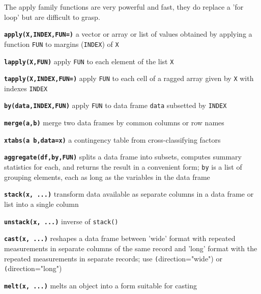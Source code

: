 \documentclass[8pt,landscape]{article}
\newcommand{\code}{\texttt}
\newcommand{\bcode}[1]{\texttt{\textbf{#1}}}
\begin{document}
\begin{multicols*}{3}
The apply family functions are very powerful and fast, they do replace a 'for loop' but are difficult to grasp. 

\bcode{apply(X,INDEX,FUN=)} a vector or array or list of values obtained by applying a
     function \code{FUN} to margins (\code{INDEX}) of \code{X}

\bcode{lapply(X,FUN)} apply \code{FUN} to each element of the list \code{X}

\bcode{tapply(X,INDEX,FUN=)} apply \code{FUN} to each cell
of a ragged array given by \code{X} with indexes \code{INDEX}

\bcode{by(data,INDEX,FUN)} apply \code{FUN} to data frame \code{data}
subsetted by \code{INDEX}

\bcode{merge(a,b)} merge two data frames by common columns or row names

\bcode{xtabs(a~b,data=x)} a contingency table from cross-classifying factors

\bcode{aggregate(df,by,FUN)} splits a data frame into subsets, computes summary statistics for
     each, and returns the result in a convenient form; \code{by} is a
     list of grouping elements, each as long as the variables in the data frame

\bcode{stack(x, ...)} transform data available as
     separate columns in a data frame or list into a single column

\bcode{unstack(x, ...)} inverse of \code{stack()}



\bcode{cast(x, ...)} reshapes a data frame between 'wide' format with
     repeated measurements in separate columns of the same record and
     'long' format with the repeated measurements in separate records;
     use \code(direction="wide") or \code(direction="long")

\bcode{melt(x, ...)} melts an object into a form suitable for casting

% 
% 
%  
% 


\end{multicols*}
\end{document}
